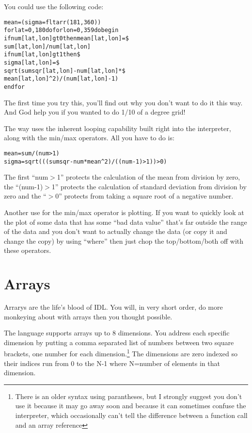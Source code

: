     You could use the following  code:

\begin{alltt}
mean=(sigma=fltarr(181,360))
for lat=0,180 do for lon=0,359 do begin 
  if num[lat,lon] gt 0 then mean[lat,lon] = \$
            sum[lat,lon]/num[lat,lon]
  if num[lat,lon] gt 1 then \$
    sigma[lat,lon] = \$
	sqrt(sumsqr[lat,lon]-num[lat,lon]*\$
             mean[lat,lon]^2)/(num[lat,lon]-1)
endfor
\end{alltt}

  The first time you try this, you'll find out why you don't want to
  do it this way. And God help you if you wanted to do 1/10 of a
  degree grid!

  The  way uses the inherent looping capability built right
    into the interpreter, along with the min/max operators. All you
    have to do is:

\begin{alltt}
mean=sum/(num>1)
sigma=sqrt( ((sumsqr-num*mean^2)/( (num-1)>1))>0)
\end{alltt}

  {\large {} }

  The first ``num$>$1'' protects the calculation of the mean from
  division by zero, the ``(num-1)$>$1'' protects the calculation of
  standard deviation from division by zero and the ``$>$0'' protects
  from taking a square root of a negative number.

  Another use for the min/max operator is plotting. If you want to
  quickly look at the plot of some data that has some ``bad data value''
  that's far outside the range of the data and you don't want to
  actually change the data (or copy it and change the copy) by using
  ``where'' then just chop the
  top/bottom/both off with these operators.


\section{Arrays}\label{sec:qs-Arrays}

  Arrarys are the life's blood of IDL. You will, in very short order,
  do more monkeying about with arrays then you thought possible. 

  The language supports arrays up to 8 dimensions. You address each
  specific dimension by putting a comma separated list of numbers
  between two square brackets, one number for each
  dimension.\footnote{There is an older syntax using parantheses, but I
  strongly suggest you don't use it because it may go away soon and
  because it can sometimes confuse the interpreter, which occasionally
  can't tell the difference between a function call and an array
  reference} The dimensions are zero indexed so their indices run from 0
  to the N-1 where N=number of elements in that dimension.

